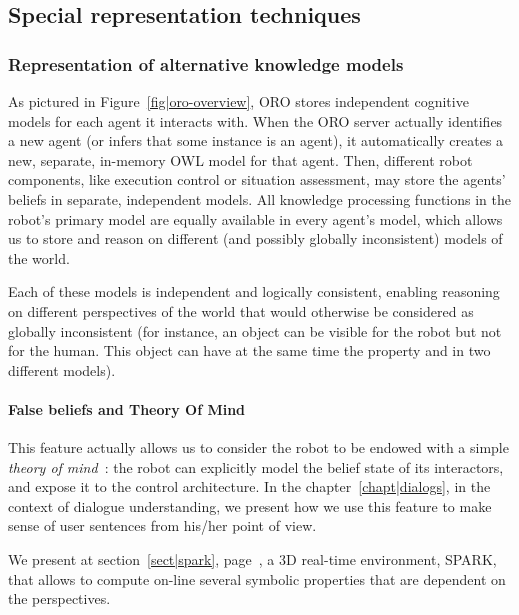 \subsection{Special representation techniques}

\subsubsection{Representation of alternative knowledge models}
\label{sect|alterite}

As pictured in Figure~\ref{fig|oro-overview}, ORO stores independent cognitive
models for each agent it interacts with. When the ORO server actually
identifies a new agent (or infers that some instance is an agent), it
automatically creates a new, separate, in-memory OWL model for that agent.
Then, different robot components, like execution control or situation
assessment, may store the agents' beliefs in separate, independent models. All
knowledge processing functions in the robot's primary model are equally
available in every agent's model, which allows us to store and reason on
different (and possibly globally inconsistent) models of the world.

Each of these models is independent and logically consistent, enabling
reasoning on different perspectives of the world that would otherwise be
considered as globally inconsistent (for instance, an object can be visible for
the robot but not for the human. This object can have at the same time the
property  and  in two different models).

\paragraph{False beliefs and Theory Of Mind} \label{sect|theory-of-mind}

This feature actually allows us to consider the robot to be endowed with a
simple \emph{theory of mind}~\cite{Scassellati2002, Warnier2012a}: the robot
can explicitly model the belief state of its interactors, and expose it to the
control architecture. In the chapter~\ref{chapt|dialogs},  in the context of
dialogue understanding, we present how we use this feature to make sense of
user sentences from his/her point of view.

We present at section~\ref{sect|spark}, page~\pageref{sect|spark}, a 3D
real-time environment, SPARK, that allows to compute on-line several symbolic
properties that are dependent on the perspectives.

